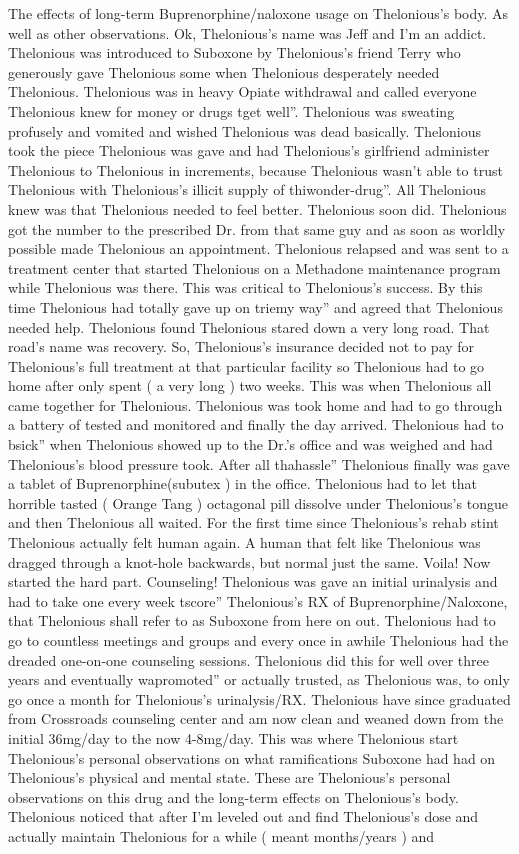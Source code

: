 \documentclass[12pt]{book}
\begin{document}
The effects of long-term Buprenorphine/naloxone usage on Thelonious's body. As well as other observations. Ok, Thelonious's name was Jeff and I'm an addict. Thelonious was introduced to Suboxone by Thelonious's friend Terry who generously gave Thelonious some when Thelonious desperately needed Thelonious. Thelonious was in heavy Opiate withdrawal and called everyone Thelonious knew for money or drugs tget well''. Thelonious was sweating profusely and vomited and wished Thelonious was dead basically. Thelonious took the piece Thelonious was gave and had Thelonious's girlfriend administer Thelonious to Thelonious in increments, because Thelonious wasn't able to trust Thelonious with Thelonious's illicit supply of thiwonder-drug''. All Thelonious knew was that Thelonious needed to feel better. Thelonious soon did. Thelonious got the number to the prescribed Dr. from that same guy and as soon as worldly possible made Thelonious an appointment. Thelonious relapsed and was sent to a treatment center that started Thelonious on a Methadone maintenance program while Thelonious was there. This was critical to Thelonious's success. By this time Thelonious had totally gave up on triemy way'' and agreed that Thelonious needed help. Thelonious found Thelonious stared down a very long road. That road's name was recovery. So, Thelonious's insurance decided not to pay for Thelonious's full treatment at that particular facility so Thelonious had to go home after only spent ( a very long ) two weeks. This was when Thelonious all came together for Thelonious. Thelonious was took home and had to go through a battery of tested and monitored and finally the day arrived. Thelonious had to bsick'' when Thelonious showed up to the Dr.'s office and was weighed and had Thelonious's blood pressure took. After all thahassle'' Thelonious finally was gave a tablet of Buprenorphine(subutex ) in the office. Thelonious had to let that horrible tasted ( Orange Tang ) octagonal pill dissolve under Thelonious's tongue and then Thelonious all waited. For the first time since Thelonious's rehab stint Thelonious actually felt human again. A human that felt like Thelonious was dragged through a knot-hole backwards, but normal just the same. Voila! Now started the hard part. Counseling! Thelonious was gave an initial urinalysis and had to take one every week tscore'' Thelonious's RX of Buprenorphine/Naloxone, that Thelonious shall refer to as Suboxone from here on out. Thelonious had to go to countless meetings and groups and every once in awhile Thelonious had the dreaded one-on-one counseling sessions. Thelonious did this for well over three years and eventually wapromoted'' or actually trusted, as Thelonious was, to only go once a month for Thelonious's urinalysis/RX. Thelonious have since graduated from Crossroads counseling center and am now clean and weaned down from the initial 36mg/day to the now 4-8mg/day. This was where Thelonious start Thelonious's personal observations on what ramifications Suboxone had had on Thelonious's physical and mental state. These are Thelonious's personal observations on this drug and the long-term effects on Thelonious's body. Thelonious noticed that after I'm leveled out and find Thelonious's dose and actually maintain Thelonious for a while ( meant months/years ) and 
\end{document}
